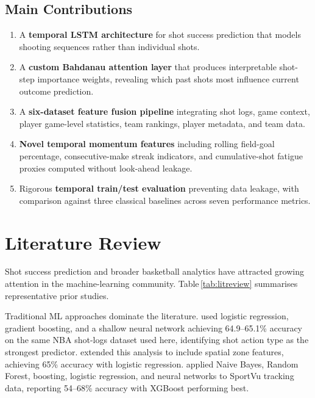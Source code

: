 \documentclass[conference]{IEEEtran}
\begin{document}
\subsection{Main Contributions}

\begin{enumerate}
    \item A \textbf{temporal LSTM architecture} for shot success
          prediction that models shooting sequences rather than
          individual shots.
    \item A \textbf{custom Bahdanau attention layer} that produces
          interpretable shot-step importance weights, revealing which
          past shots most influence current outcome prediction.
    \item A \textbf{six-dataset feature fusion pipeline} integrating
          shot logs, game context, player game-level statistics, team
          rankings, player metadata, and team data.
    \item \textbf{Novel temporal momentum features} including rolling
          field-goal percentage, consecutive-make streak indicators,
          and cumulative-shot fatigue proxies computed without
          look-ahead leakage.
    \item Rigorous \textbf{temporal train/test evaluation} preventing
          data leakage, with comparison against three classical
          baselines across seven performance metrics.
\end{enumerate}

\section{Literature Review}

Shot success prediction and broader basketball analytics have attracted
growing attention in the machine-learning community.  Table\,\ref{tab:litreview}
summarises representative prior studies.

Traditional ML approaches dominate the literature.  \cite{b1} used
logistic regression, gradient boosting, and a shallow neural network
achieving 64.9–65.1\% accuracy on the same NBA shot-logs dataset used
here, identifying shot action type as the strongest predictor.
\cite{b2} extended this analysis to include spatial zone features,
achieving 65\% accuracy with logistic regression.  \cite{b3} applied
Naive Bayes, Random Forest, boosting, logistic regression, and neural
networks to SportVu tracking data, reporting 54–68\% accuracy with
XGBoost performing best.
\end{document}
